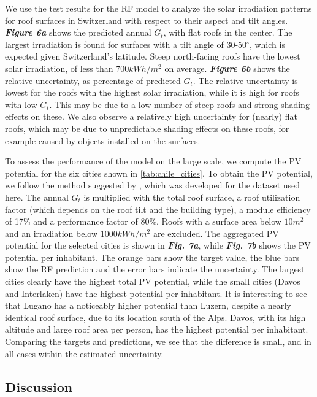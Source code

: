 We use the test results for the RF model to analyze the solar irradiation patterns for roof surfaces in Switzerland with respect to their aspect and tilt angles.\textbf{\textit{ Figure 6a}} shows the predicted annual $G_t$, with flat roofs in the center. The largest irradiation is found for surfaces with a tilt angle of 30-50$^\circ$, which is expected given Switzerland’s latitude. Steep north-facing roofs have the lowest solar irradiation, of less than $700 kWh/m^2$ on average. \textbf{\textit{Figure 6b}} shows the relative uncertainty, as percentage of predicted $G_t$. The relative uncertainty is lowest for the roofs with the highest solar irradiation, while it is high for roofs with low $G_t$. This may be due to a low number of steep roofs and strong shading effects on these. We also observe a relatively high uncertainty for (nearly) flat roofs, which may be due to unpredictable shading effects on these roofs, for example caused by objects installed on the surfaces.

To assess the performance of the model on the large scale, we compute the PV potential for the six cities shown in \ref{tab:chile_cities}. To obtain the PV potential, we follow the method suggested by \cite{portmann_sonnendach.ch:_2016}, which was developed for the dataset used here. The annual $G_t$ is multiplied with the total roof surface, a roof utilization factor (which depends on the roof tilt and the building type), a module efficiency of 17\% and a performance factor of 80\%. Roofs with a surface area below $10 m^2$ and an irradiation below $1000 kWh/m^2$ are excluded. The aggregated PV potential for the selected cities is shown in \textbf{\textit{Fig. 7a}}, while \textbf{\textit{Fig. 7b}} shows the PV potential per inhabitant. The orange bars show the target value, the blue bars show the RF prediction and the error bars indicate the uncertainty. The largest cities clearly have the highest total PV potential, while the small cities (Davos and Interlaken) have the highest potential per inhabitant. It is interesting to see that Lugano has a noticeably higher potential than Luzern, despite a nearly identical roof surface, due to its location south of the Alps. Davos, with its high altitude and large roof area per person, has the highest potential per inhabitant. Comparing the targets and predictions, we see that the difference is small, and in all cases within the estimated uncertainty.



\subsection{Discussion}


